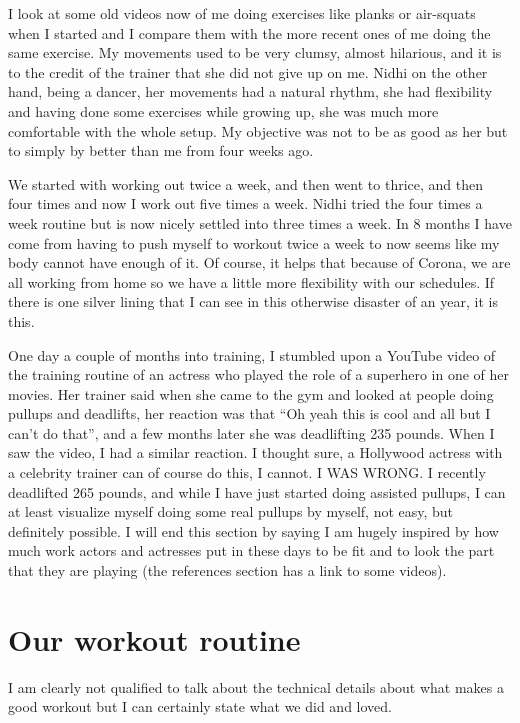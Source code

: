 \documentclass[
  oneside]{book}
\begin{document}
I look at some old videos now of me doing exercises like planks or air-squats when I started and I compare them with the more recent ones of me doing the same exercise. My movements used to be very clumsy, almost hilarious, and it is to the credit of the trainer that she did not give up on me. Nidhi on the other hand, being a dancer, her movements had a natural rhythm, she had flexibility and having done some exercises while growing up, she was much more comfortable with the whole setup. My objective was not to be as good as her but to simply by better than me from four weeks ago.

We started with working out twice a week, and then went to thrice, and then four times and now I work out five times a week. Nidhi tried the four times a week routine but is now nicely settled into three times a week. In 8 months I have come from having to push myself to workout twice a week to now seems like my body cannot have enough of it. Of course, it helps that because of Corona, we are all working from home so we have a little more flexibility with our schedules. If there is one silver lining that I can see in this otherwise disaster of an year, it is this.

One day a couple of months into training, I stumbled upon a YouTube video of the training routine of an actress who played the role of a superhero in one of her movies. Her trainer said when she came to the gym and looked at people doing pullups and deadlifts, her reaction was that ``Oh yeah this is cool and all but I can't do that'', and a few months later she was deadlifting 235 pounds. When I saw the video, I had a similar reaction. I thought sure, a Hollywood actress with a celebrity trainer can of course do this, I cannot. I WAS WRONG. I recently deadlifted 265 pounds, and while I have just started doing assisted pullups, I can at least visualize myself doing some real pullups by myself, not easy, but definitely possible. I will end this section by saying I am hugely inspired by how much work actors and actresses put in these days to be fit and to look the part that they are playing (the references section has a link to some videos).

\hypertarget{our-workout-routine}{%
\section{Our workout routine}\label{our-workout-routine}}

I am clearly not qualified to talk about the technical details about what makes a good workout but I can certainly state what we did and loved.
\end{document}
